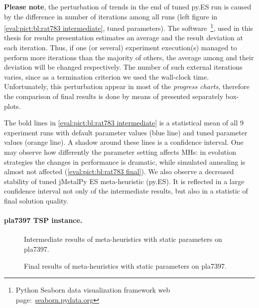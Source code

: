 \textbf{Please note}, the perturbation of trends in the end of tuned py.ES run is caused by the difference in number of iterations among all runs (left figure in \cref{eval:pict:bl:rat783 intermediate}, tuned parameters). The software~\footnote{Python Seaborn data visualization framework web page:~\href{https://seaborn.pydata.org/}{seaborn.pydata.org}}, used in this thesis for results presentation estimates an average and the result deviation at each iteration. Thus, if one (or several) experiment execution(s) managed to perform more iterations than the majority of others, the average among and their deviation will be changed respectively. The number of such external iterations varies, since as a termination criterion we used the wall-clock time. Unfortunately, this perturbation appear in most of the \emph{progress charts}, therefore the comparison of final results is done by means of presented separately box-plots.


The bold lines in \cref{eval:pict:bl:rat783 intermediate} is a statistical mean of all 9 experiment runs with default parameter values (blue line) and tuned parameter values (orange line). A shadow around these lines is a confidence interval. One may observe how differently the parameter setting affects MHs: in evolution strategies the changes in performance is dramatic, while simulated annealing is almost not affected (\cref{eval:pict:bl:rat783 final}). We also observe a decreased stability of tuned jMetalPy ES meta-heuristic (py.ES). It is reflected in a large confidence interval not only of the intermediate results, but also in a statistic of final solution quality.


\paragraph{pla7397 TSP instance.} 

\begin{figure}[b]
	\centering
	\vspace{-20pt}
	
	\caption{Intermediate results of meta-heuristics with static parameters on pla7397.}
	\vspace{-5pt}
	\label{eval:pict:bl:pla7397 intermediate}
\end{figure}

\begin{wrapfigure}{R}{0.5\textwidth}%
	\centering
	
	\label{eval:pict:bl:pla7397 final}
	\caption{Final results of meta-heuristics with static parameters on pla7397.}
	\vspace{-10pt}
\end{wrapfigure}

